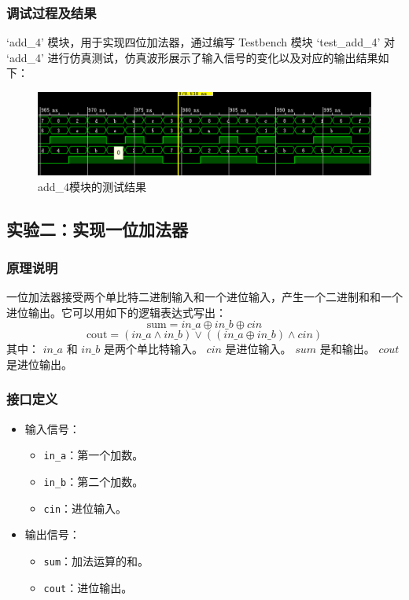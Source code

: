 \documentclass[zihao=5, UTF8]{article}
\theoremstyle{MyLineTheoremStyle} %
\theoremstyle{MyBlockTheoremStyle} %
\theoremstyle{MySubsubsectionStyle} %
\begin{document}
\subsubsection{调试过程及结果}
 `add\_4' 模块，用于实现四位加法器，通过编写 Testbench 模块 `test\_add\_4' 对 `add\_4' 进行仿真测试，仿真波形展示了输入信号的变化以及对应的输出结果如下：
 \begin{figure}[htbp]
    \centering
    \includegraphics[width=\textwidth]{add_4.png} %
    \caption{add\_4模块的测试结果}
    \label{fig:add_4模块的测试结果}
\end{figure}


\subsection{实验二：实现一位加法器}

\subsubsection{原理说明}
一位加法器接受两个单比特二进制输入和一个进位输入，产生一个二进制和和一个进位输出。它可以用如下的逻辑表达式写出：
\[
\text{sum} = in\_a \oplus in\_b \oplus cin
\]
\[
\text{cout} = (in\_a \land in\_b) \lor ((in\_a \oplus in\_b) \land cin)
\]
其中：
 \( in\_a \) 和 \( in\_b \) 是两个单比特输入。
 \( cin \) 是进位输入。
 \( sum \) 是和输出。
 \( cout \) 是进位输出。
\subsubsection{接口定义}
\begin{itemize}
    \item 输入信号：
    \begin{itemize}
        \item \texttt{in\_a}：第一个加数。
        \item \texttt{in\_b}：第二个加数。
        \item \texttt{cin}：进位输入。
    \end{itemize}
    \item 输出信号：
    \begin{itemize}
        \item \texttt{sum}：加法运算的和。
        \item \texttt{cout}：进位输出。
    \end{itemize}
\end{itemize}
\end{document}
